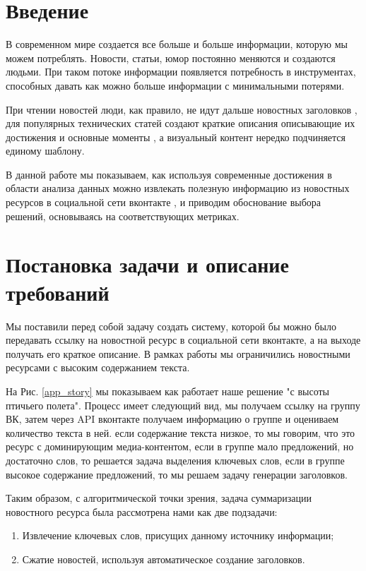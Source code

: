 \documentclass[14pt]{matmex-diploma-custom}
\begin{document}
\section*{Введение}
В современном мире создается все больше и больше информации, которую мы можем потреблять.
Новости, статьи, юмор постоянно меняются и создаются людьми. При таком потоке информации
появляется потребность в инструментах, способных давать как можно больше информации
с минимальными потерями.

При чтении новостей люди, как правило, не идут дальше новостных заголовков \cite{jaysondemers2016},
для популярных технических статей создают краткие описания описывающие их достижения
и основные моменты \cite{tldr_arxiv2019, articleessence2019}, а визуальный контент нередко подчиняется единому шаблону.

В данной работе мы показываем, как используя современные достижения в области анализа
данных можно извлекать полезную информацию из новостных ресурсов в социальной сети вконтакте \cite{vk2019},
и приводим обоснование выбора решений, основываясь на соответствующих метриках.

\section{Постановка задачи и описание требований}
Мы поставили перед собой задачу создать систему, которой бы можно было передавать ссылку на новостной ресурс в социальной сети вконтакте, а на выходе получать его краткое описание. В рамках работы мы ограничились новостными ресурсами с высоким содержанием текста.

На Рис. \ref{app_story} мы показываем как работает наше решение "с высоты птичьего полета". Процесс имеет следующий вид, мы получаем ссылку на группу ВК, затем через API вконтакте получаем информацию о группе и оцениваем количество текста в ней. если содержание текста низкое, то мы говорим, что это ресурс с доминирующим медиа-контентом, если в группе мало предложений, но достаточно слов, то решается задача выделения ключевых слов, если в группе высокое содержание предложений, то мы решаем задачу генерации заголовков.

Таким образом, с алгоритмической точки зрения, задача суммаризации новостного ресурса была рассмотрена нами как две подзадачи:
\begin{enumerate}
  \item Извлечение ключевых слов, присущих данному источнику информации;
  \item Сжатие новостей, используя автоматическое создание заголовков.
\end{enumerate}
\end{document}
